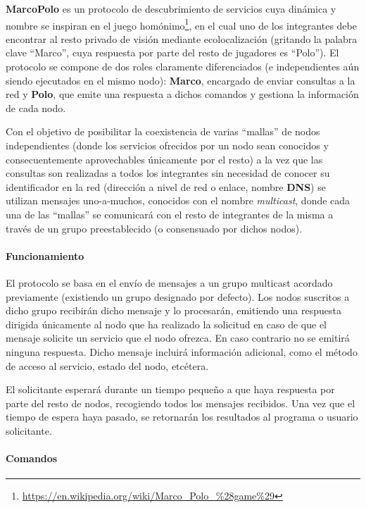 \textbf{MarcoPolo} es un protocolo de descubrimiento de servicios cuya dinámica y nombre se inspiran en el juego homónimo\footnote{\href{https://en.wikipedia.org/wiki/Marco\_Polo\_\%28game\%29}{https://en.wikipedia.org/wiki/Marco\_Polo\_\%28game\%29}}, en el cual uno de los integrantes debe encontrar al resto privado de visión mediante ecolocalización (gritando la palabra clave ``Marco'', cuya respuesta por parte del resto de jugadores es ``Polo''). El protocolo se compone de dos roles claramente diferenciados (e independientes aún siendo ejecutados en el mismo nodo): \textbf{Marco}, encargado de enviar consultas a la red y \textbf{Polo}, que emite una respuesta a dichos comandos y gestiona la información de cada nodo. %

Con el objetivo de posibilitar la coexistencia de varias ``mallas'' de nodos independientes (donde los servicios ofrecidos por un nodo sean conocidos y consecuentemente aprovechables únicamente por el resto) a la vez que las consultas son realizadas a todos los integrantes sin necesidad de conocer su identificador en la red (dirección a nivel de red o enlace, nombre \textbf{DNS}) se utilizan mensajes uno-a-muchos, conocidos con el nombre \textit{multicast}, donde cada una de las ``mallas'' se comunicará con el resto de integrantes de la misma a través de un grupo preestablecido (o consensuado por dichos nodos).

\paragraph{Funcionamiento}

El protocolo se basa en el envío de mensajes a un grupo multicast acordado previamente (existiendo un grupo designado por defecto). Los nodos suscritos a dicho grupo recibirán dicho mensaje y lo procesarán, emitiendo una respuesta dirigida únicamente al nodo que ha realizado la solicitud en caso de que el mensaje solicite un servicio que el nodo ofrezca. En caso contrario no se emitirá ninguna respuesta. Dicho mensaje incluirá información adicional, como el método de acceso al servicio, estado del nodo, etcétera.

El solicitante esperará durante un tiempo pequeño a que haya respuesta por parte del resto de nodos, recogiendo todos los mensajes recibidos. Una vez que el tiempo de espera haya pasado, se retornarán los resultados al programa o usuario solicitante.

\paragraph{Comandos}


